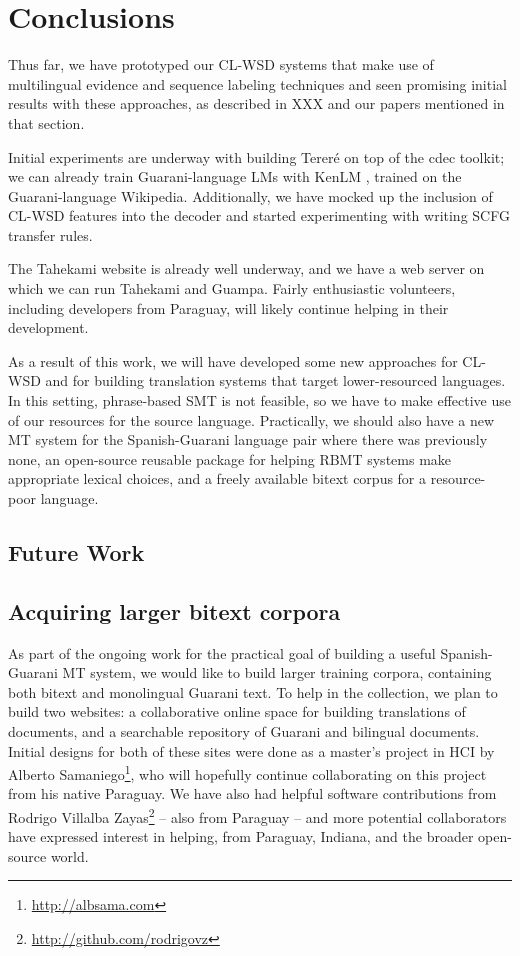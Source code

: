 \chapter{Conclusions}
\label{chap:conclusions}
Thus far, we have prototyped our CL-WSD systems that make use of multilingual
evidence and sequence labeling techniques and seen promising initial results
with these approaches, as described in XXX and our papers
mentioned in that section.

Initial experiments are underway with building Tereré on top of the cdec
toolkit; we can already train Guarani-language LMs with KenLM
\cite{Heafield-estimate}, trained on the Guarani-language Wikipedia.
Additionally, we have mocked up the inclusion of CL-WSD features into the
decoder and started experimenting with writing SCFG transfer rules.

The Tahekami website is already well underway, and we have a web server on
which we can run Tahekami and Guampa. Fairly enthusiastic volunteers, including
developers from Paraguay, will likely continue helping in their development.

As a result of this work, we will have developed some new approaches for
CL-WSD and for building translation systems that target lower-resourced
languages. In this setting, phrase-based SMT is not feasible, so we have to
make effective use of our resources for the source language.
Practically, we should also have a new MT system for the Spanish-Guarani
language pair where there was previously none, an open-source reusable
package for helping RBMT systems make appropriate lexical choices, and a freely
available bitext corpus for a resource-poor language.

\section{Future Work}
\section{Acquiring larger bitext corpora}
\label{sec:crowdsourcing}
As part of the ongoing work for the practical goal of building a useful
Spanish-Guarani MT system, we would like to build larger training corpora,
containing both bitext and monolingual Guarani text.
To help in the collection, we plan to build two websites:
a collaborative online space for building translations of documents, 
and a searchable repository of Guarani and bilingual documents.
Initial designs for both of these sites were done as a master's project in HCI
by Alberto Samaniego\footnote{\url{http://albsama.com}}, who will hopefully
continue collaborating on this project from his native Paraguay.
We have also had helpful software contributions from
Rodrigo Villalba Zayas\footnote{\url{http://github.com/rodrigovz}} --
also from Paraguay -- and more potential collaborators have expressed
interest in helping, from Paraguay, Indiana, and the broader open-source world.

